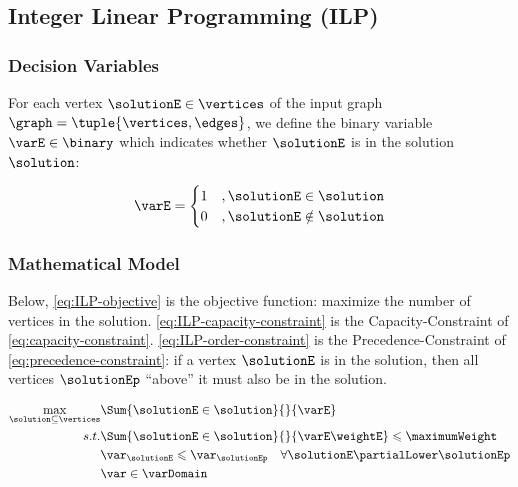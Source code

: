 \subsection{Integer Linear Programming (ILP)}

\subsubsection{Decision Variables}

For each vertex $\solutionE \in \vertices$ of the input graph $\graph = \tuple{\vertices, \edges}$, we define the binary variable $\varE \in \binary$ which indicates whether $\solutionE$ is in the solution $\solution$:

\begin{equation}
    \label{eq:decision-variables}
    \varE =  \begin{cases}
      1 &, \solutionE \in \solution \\
      0 &, \solutionE \notin \solution
   \end{cases}
\end{equation}

\subsubsection{Mathematical Model}

Below, \eqref{eq:ILP-objective} is the objective function: maximize the number of vertices in the solution.
\eqref{eq:ILP-capacity-constraint} is the Capacity-Constraint of \eqref{eq:capacity-constraint}.
\eqref{eq:ILP-order-constraint} is the Precedence-Constraint of \eqref{eq:precedence-constraint}: if a vertex $\solutionE$ is in the solution, then all vertices $\solutionEp$ ``above'' it must also be in the solution.

\begin{align}
    \label{eq:ILP-objective}
    \max\limits_{\solution \subseteq \vertices}
        & \Sum{\solutionE \in \solution}{}{\varE} \\
    s.t.
    \label{eq:ILP-capacity-constraint}
    & \Sum{\solutionE \in \solution}{}{\varE \weightE} \leqslant \maximumWeight \\
    \label{eq:ILP-order-constraint}
    & \var_{\solutionE} \leqslant \var_{\solutionEp} \quad \forall \solutionE \partialLower \solutionEp \\
    \label{eq:ILP-binary-constraint}
    & \var \in \varDomain
\end{align}
